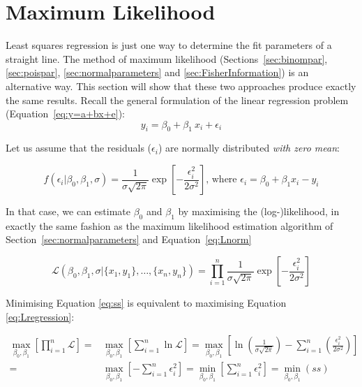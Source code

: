 \section{Maximum Likelihood}
\label{sec:MLregression}

Least squares regression is just one way to determine the fit
parameters of a straight line.  The method of maximum likelihood
(Sections~\ref{sec:binompar}, \ref{sec:poispar},
\ref{sec:normalparameters} and \ref{sec:FisherInformation}) is an
alternative way. This section will show that these two approaches
produce exactly the same results. Recall the general formulation of
the linear regression problem (Equation~\ref{eq:y=a+bx+e}):
\begin{equation*}
  y_i = \beta_0 + \beta_1~x_i + \epsilon_i
\end{equation*}

Let us assume that the residuals ($\epsilon_i$) are normally
distributed \emph{with zero mean}:

\begin{equation}
  f(\epsilon_i|\beta_0,\beta_1,\sigma) = \frac{1}{\sigma\sqrt{2\pi}}
  \exp\!\left[-\frac{\epsilon_i^2}{2\sigma^2}\right] \mbox{,~where~}
  \epsilon_i = \beta_0 + \beta_1 x_i - y_i
  \label{eq:normalresid}
\end{equation}

In that case, we can estimate $\beta_0$ and $\beta_1$ by maximising
the (log-)likelihood, in exactly the same fashion as the maximum
likelihood estimation algorithm of Section~\ref{sec:normalparameters}
and Equation~\ref{eq:Lnorm}

\begin{equation}
  \mathcal{L}(\beta_0,\beta_1,\sigma|\{x_1,y_1\},\ldots,\{x_n,y_n\}) =
  \prod\limits_{i=1}^{n}\frac{1}{\sigma\sqrt{2\pi}}
  \exp\!\left[-\frac{\epsilon_i^2}{2\sigma^2}\right]
  \label{eq:Lregression}
\end{equation}

Minimising Equation \ref{eq:ss} is equivalent to maximising Equation
\ref{eq:Lregression}:

\begin{equation}
\begin{split}
\underset{\beta_0,\beta_1}{\max}\left[\prod_{i=1}^n \mathcal{L}\right] = &
\underset{\beta_0,\beta_1}{\max}\left[\sum_{i=1}^n \ln\mathcal{L}\right] =
\underset{\beta_0,\beta_1}{\max}\left[\ln\!\left(\frac{1}{\sigma\sqrt{2\pi}}\right)-\sum_{i=1}^n\left(\frac{\epsilon_i^2}{2\sigma^2}\right)\right] \\
= & \underset{\beta_0,\beta_1}{\max}\left[-\sum_{i=1}^n\epsilon_i^2\right] = 
\underset{\beta_0,\beta_1}{\min}\left[\sum_{i=1}^{n} \epsilon_i^2\right] = \underset{\beta_0,\beta_1}{\min}(ss)
\end{split}
\end{equation}

